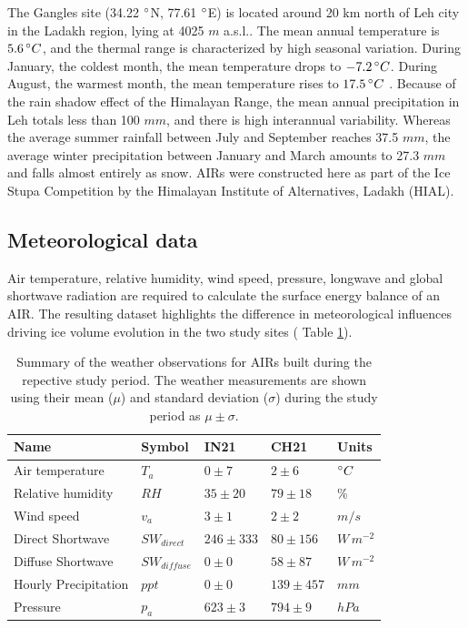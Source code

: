 The Gangles site (34.22 $^{\circ}$N, 77.61 $^{\circ}$E) is located around 20 km north of Leh city in the Ladakh
region, lying at 4025 $m$ a.s.l.. The mean annual temperature is $5.6 \, ^{\circ} C$, and the thermal range is
characterized by high seasonal variation. During January, the coldest month, the mean temperature drops to $-7.2
\, ^{\circ} C$. During August, the warmest month, the mean temperature rises to $17.5 \, ^{\circ} C$
\citep{nusserIrrigationDevelopmentUpper2012}. Because of the rain shadow effect of the Himalayan Range, the mean
annual precipitation in Leh totals less than 100 $mm$, and there is high interannual variability. Whereas the
average summer rainfall between July and September reaches 37.5 $mm$, the average winter precipitation between
January and March amounts to 27.3 $ mm$ and falls almost entirely as snow. \ac{AIRs} were constructed here as part of
the Ice Stupa Competition by the Himalayan Institute of Alternatives, Ladakh (HIAL). 

\subsection{Meteorological data}

Air temperature, relative humidity, wind speed, pressure, longwave and global shortwave radiation are required
to calculate the surface energy balance of an AIR.  The resulting dataset highlights the difference in
meteorological influences driving ice volume evolution in the two study sites ( Table
\ref{tab:Observations}).

\begin{table}
  \centering
  \caption{Summary of the weather observations for \ac{AIRs} built during the repective study period. 
The weather measurements are shown using their mean ($\mu$) and standard deviation ($\sigma$) during the study
period as $\mu \pm \sigma$. }

	\label{tab:Observations}
	\begin{tabular}{|lllll|}
    \hline
		\textbf{Name}               & \textbf{Symbol} & \textbf{IN21} & \textbf{CH21} & \textbf{Units}   \\ \hline
		Air temperature             & $T_a    $       & $0 \pm 7$     & $2 \pm 6$     & $^{\circ} C$      \\
		Relative humidity           & $RH     $       & $35 \pm 20$   & $79 \pm 18$   & \%               \\
    Wind speed                  & $v_a        $   & $3 \pm 1$     & $2 \pm 2$     & $m/s$            \\
		Direct Shortwave            & $SW_{direct} $  & $246 \pm 333$ & $80 \pm 156$  & $W\,m^{-2}$      \\
		Diffuse Shortwave           & $SW_{diffuse}$  & $0 \pm 0$     & $58 \pm 87$   & $W\,m^{-2}$      \\
		Hourly Precipitation        & $ppt        $   & $0 \pm 0$     & $139 \pm 457$ & $mm$             \\
		Pressure                    & $p_a         $  & $623 \pm 3$   & $794 \pm 9$   & $hPa$            \\\hline
	\end{tabular}
\end{table}

